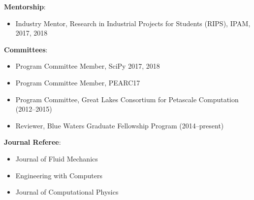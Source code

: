 
\textbf{Mentorship}:
\begin{itemize}
\itemsep 0pt
 \item Industry Mentor, Research in Industrial Projects for Students
       (RIPS), IPAM, 2017, 2018
\end{itemize}

\blankline


\textbf{Committees}:
\begin{itemize}
\itemsep 0pt
 \item Program Committee Member, SciPy 2017, 2018
 \item Program Committee Member, PEARC17
 \item Program Committee, Great Lakes Consortium for Petascale Computation (2012--2015)
 \item Reviewer, Blue Waters Graduate Fellowship Program (2014--present)
\end{itemize}

\blankline

\textbf{Journal Referee}:
\begin{itemize}
\itemsep 0pt
 \item Journal of Fluid Mechanics
 \item Engineering with Computers
 \item Journal of Computational Physics
\end{itemize}
